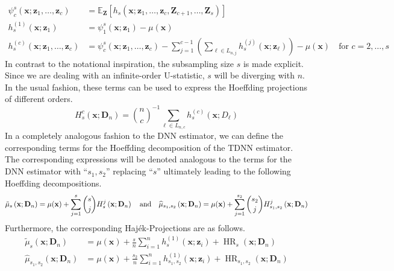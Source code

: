 \documentclass[letterpaper,10pt]{article}
\numberwithin{equation}{section}
\numberwithin{thm}{section}
\numberwithin{lem}{section}
\numberwithin{cor}{section}
\renewcommand{\hat}{\widehat}
\newcommand{\1}{\mathbb{1}}
\begin{document}
\begin{align}
	\psi_{c}^{s}(\mathbf{x}; \mathbf{z}_{1}, \dotsc, \mathbf{z}_{c})
	 & = \mathbb{E}_{\mathbf{Z}}\left[h_{s}\left(\mathbf{x}; \mathbf{z}_{1}, \dotsc, \mathbf{z}_{c}, \mathbf{Z}_{c+1}, \dotsc, \mathbf{Z}_{s}\right)\right]                                    \\
	h_{s}^{(1)}\left(\mathbf{x}; \mathbf{z}_{1}\right)
	 & = \psi_{1}^{s}(\mathbf{x}; \mathbf{z}_{1}) - \mu(\mathbf{x})                                                                                                                            \\
	h_{s}^{(c)}\left(\mathbf{x}; \mathbf{z}_{1}, \dotsc, \mathbf{z}_{c}\right)
	 & = \psi_{c}^{s}(\mathbf{x}; \mathbf{z}_{1}, \dotsc, \mathbf{z}_{c}) - \sum_{j = 1}^{c-1}\left(\sum_{\ell \in L_{n,j}}h_{s}^{(j)}(\mathbf{x}; \mathbf{z}_{\ell})\right) - \mu(\mathbf{x})
	\quad \text{for } c = 2, \dotsc, s
\end{align}
In contrast to the notational inspiration, the subsampling size $s$ is made explicit.
Since we are dealing with an infinite-order U-statistic, $s$ will be diverging with $n$.
In the usual fashion, these terms can be used to express the Hoeffding projections of different orders.
\begin{equation}
	H_{s}^{c}\left(\mathbf{x}; \mathbf{D}_n\right)
	= \binom{n}{c}^{-1} \sum_{\ell \in L_{n,c}} h^{(c)}_{s}(\mathbf{x}; D_{\ell})
\end{equation}
In a completely analogous fashion to the DNN estimator, we can define the corresponding terms for the Hoeffding decomposition of the TDNN estimator.
The corresponding expressions will be denoted analogous to the terms for the DNN estimator with ``$s_1, s_2$'' replacing ``$s$'' ultimately leading to the following Hoeffding decompositions.
\begin{equation}
	\tilde{\mu}_{s}\left(\mathbf{x}; \mathbf{D}_n\right)
	= \mu(\mathbf{x}) + \sum_{j = 1}^{s}\binom{s}{j}H_{s}^{j}\left(\mathbf{x}; \mathbf{D}_n\right)\\
	\quad \text{and} \quad
	\hat{\mu}_{s_1, s_2}\left(\mathbf{x}; \mathbf{D}_n\right)
	= \mu(\mathbf{x}) + \sum_{j = 1}^{s_2}\binom{s_2}{j}H_{s_1, s_2}^{j}\left(\mathbf{x}; \mathbf{D}_n\right)
\end{equation}
Furthermore, the corresponding Haj\'ek-Projections are as follows.
\begin{equation}
	\begin{aligned}
		\tilde{\mu}_{s}\left(\mathbf{x}; \mathbf{D}_n\right)
		 & = \mu(\mathbf{x}) + \frac{s}{n}\sum_{i = 1}^{n}h^{(1)}_{s}(\mathbf{x}; \mathbf{z}_{i})
		+ \operatorname{HR}_{s}(\mathbf{x}; \mathbf{D}_n)                                                   \\
		\hat{\mu}_{s_1, s_2}\left(\mathbf{x}; \mathbf{D}_n\right)
		 & = \mu(\mathbf{x}) + \frac{s_2}{n}\sum_{i = 1}^{n} h^{(1)}_{s_1, s_2}(\mathbf{x}; \mathbf{z}_{i})
		+ \operatorname{HR}_{s_1, s_2}(\mathbf{x}; \mathbf{D}_n)
	\end{aligned}
\end{equation}
\end{document}
